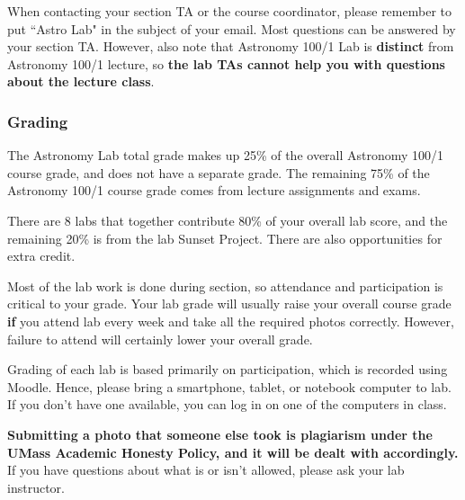 \documentclass[main.tex]{subfiles}
\begin{document}
When contacting your section TA or the course coordinator, please remember to put ``Astro Lab" in the subject of your email. Most questions can be answered by your section TA. However, also note that Astronomy 100/1 Lab is \textbf{distinct} from Astronomy 100/1 lecture, so \textbf{the lab TAs cannot help you with questions about the lecture class}.

\subsubsection{Grading}
The Astronomy Lab total grade makes up 25\% of the overall Astronomy 100/1 course grade, and does not have a separate grade. The remaining 75\% of the Astronomy 100/1 course grade comes from lecture assignments and exams.

There are 8 labs that together contribute 80\% of your overall lab score, and the remaining 20\% is from the lab Sunset Project. There are also opportunities for extra credit.

Most of the lab work is done during section, so attendance and participation is critical to your grade. Your lab grade will usually raise your overall course grade \textbf{if} you attend lab every week and take all the required photos correctly. However, failure to attend will certainly lower your overall grade.

Grading of each lab is based primarily on participation, which is recorded using Moodle. Hence, please bring a smartphone, tablet, or notebook computer to lab. If you don't have one available, you can log in on one of the computers in class.

\textbf{Submitting a photo that someone else took is plagiarism under the UMass Academic Honesty Policy, and it will be dealt with accordingly.} If you have questions about what is or isn't allowed, please ask your lab instructor.
\end{document}
